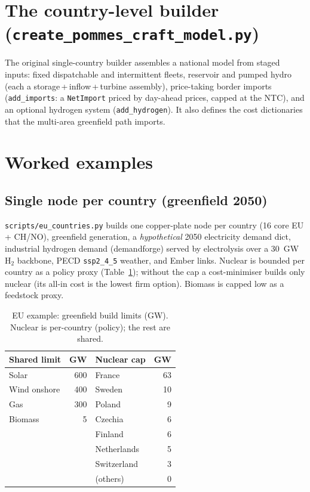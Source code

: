 \documentclass[11pt,a4paper]{article}
\begin{document}
\section{The country-level builder (\texttt{create\_pommes\_craft\_model.py})}
The original single-country builder assembles a national model from staged inputs: fixed dispatchable
and intermittent fleets, reservoir and pumped hydro (each a storage\,+\,inflow\,+\,turbine assembly),
price-taking border imports (\texttt{add\_imports}: a \texttt{NetImport} priced by day-ahead prices,
capped at the NTC), and an optional hydrogen system (\texttt{add\_hydrogen}). It also defines the cost
dictionaries that the multi-area greenfield path imports.

\section{Worked examples}
\subsection{Single node per country (greenfield 2050)}
\texttt{scripts/eu\_countries.py} builds one copper-plate node per country (16 core EU + CH/NO),
greenfield generation, a \emph{hypothetical} 2050 electricity demand dict, industrial hydrogen demand
(demandforge) served by electrolysis over a 30~GW H$_2$ backbone, PECD \texttt{ssp2\_4\_5} weather, and
Ember links. Nuclear is bounded per country as a policy proxy (Table~\ref{tab:caps}); without the cap a
cost-minimiser builds only nuclear (its all-in cost is the lowest firm option). Biomass is capped low
as a feedstock proxy.

\begin{table}[ht]
\centering
\caption{EU example: greenfield build limits (GW). Nuclear is per-country (policy); the rest are shared.}
\label{tab:caps}
\small
\begin{tabular}{@{}lr@{\hskip 18pt}lr@{}}
\toprule
\textbf{Shared limit} & \textbf{GW} & \textbf{Nuclear cap} & \textbf{GW} \\
\midrule
Solar         & 600 & France         & 63 \\
Wind onshore  & 400 & Sweden         & 10 \\
Gas           & 300 & Poland         & 9 \\
Biomass       & 5   & Czechia        & 6 \\
              &     & Finland        & 6 \\
              &     & Netherlands    & 5 \\
              &     & Switzerland    & 3 \\
              &     & (others)       & 0 \\
\bottomrule
\end{tabular}
\end{table}
\end{document}
